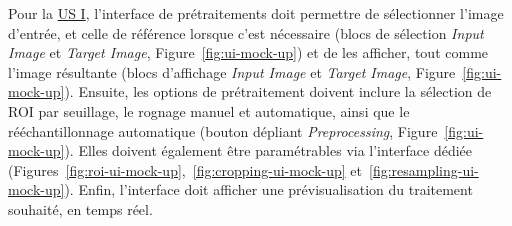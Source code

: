 \documentclass{article}
\begin{document}
{{        \bigskip

        Pour la \hyperref[us:preprocessing]{US I}, l'interface de prétraitements doit permettre de sélectionner l'image d'entrée, et celle de référence lorsque c'est nécessaire (blocs de sélection \textit{Input Image} et \textit{Target Image}, Figure~\ref{fig:ui-mock-up}) et de les afficher, tout comme l'image résultante (blocs d'affichage \textit{Input Image} et \textit{Target Image}, Figure~\ref{fig:ui-mock-up}).
        Ensuite, les options de prétraitement doivent inclure la sélection de ROI par seuillage, le rognage manuel et automatique, ainsi que le rééchantillonnage automatique (bouton dépliant \textit{Preprocessing}, Figure~\ref{fig:ui-mock-up}).
        Elles doivent également être paramétrables via l'interface dédiée (Figures~\ref{fig:roi-ui-mock-up},~\ref{fig:cropping-ui-mock-up} et~\ref{fig:resampling-ui-mock-up}).
        Enfin, l'interface doit afficher une prévisualisation du traitement souhaité, en temps réel.

}}
\end{document}

